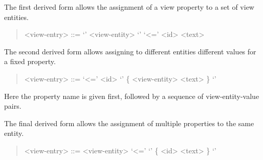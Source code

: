The first derived form allows the assignment of a view property to a set
of view entities.
%
\begin{quote}\begin{grammar}
  <view-entry> ::= `{' {<view-entity>} `}' `<=' <id> <text>
\end{grammar}\end{quote}%
%

The second derived form allows
assigning to different entities different values for a fixed property.
%
\begin{quote}\begin{grammar}
  <view-entry> ::= `<=' <id> `{' \{ <view-entity> <text> \} `}'
\end{grammar}\end{quote}%
%
Here the property name is given first, followed by a sequence of view-entity-value pairs.

The final derived form allows the assignment of multiple properties
to the same entity.
%
\begin{quote}\begin{grammar}
  <view-entry> ::= <view-entity> `<=' `{' \{ <id> <text> \} `}'
\end{grammar}\end{quote}%
%

%
%
